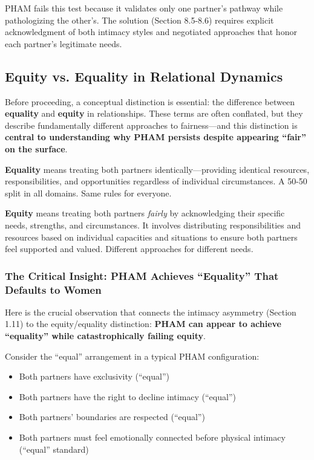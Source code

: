 \documentclass[12pt, letterpaper]{article}
\begin{document}
PHAM fails this test because it validates only one partner's pathway while pathologizing the other's. The solution (Section 8.5-8.6) requires explicit acknowledgment of both intimacy styles and negotiated approaches that honor each partner's legitimate needs.

\subsection{Equity vs. Equality in Relational Dynamics}

Before proceeding, a conceptual distinction is essential: the difference between \textbf{equality} and \textbf{equity} in relationships. These terms are often conflated, but they describe fundamentally different approaches to fairness---and this distinction is \textbf{central to understanding why PHAM persists despite appearing ``fair'' on the surface}.

\textbf{Equality} means treating both partners identically---providing identical resources, responsibilities, and opportunities regardless of individual circumstances. A 50-50 split in all domains. Same rules for everyone.

\textbf{Equity} means treating both partners \textit{fairly} by acknowledging their specific needs, strengths, and circumstances. It involves distributing responsibilities and resources based on individual capacities and situations to ensure both partners feel supported and valued. Different approaches for different needs.

\subsubsection{The Critical Insight: PHAM Achieves ``Equality'' That Defaults to Women}

Here is the crucial observation that connects the intimacy asymmetry (Section 1.11) to the equity/equality distinction: \textbf{PHAM can appear to achieve ``equality'' while catastrophically failing equity}.

Consider the ``equal'' arrangement in a typical PHAM configuration:
\begin{itemize}
    \item Both partners have exclusivity (``equal'')
    \item Both partners have the right to decline intimacy (``equal'')
    \item Both partners' boundaries are respected (``equal'')
    \item Both partners must feel emotionally connected before physical intimacy (``equal'' standard)
\end{itemize}
\end{document}
